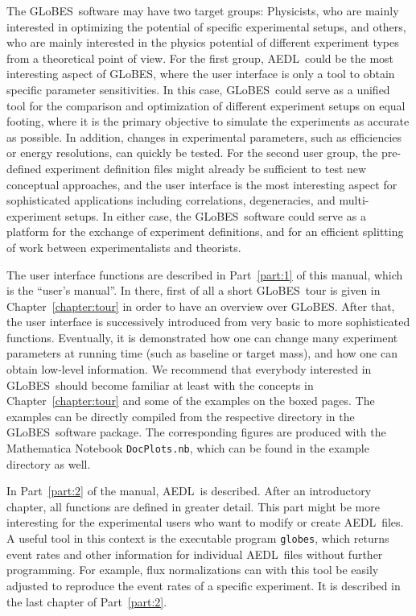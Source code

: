 \documentclass[a4paper,12pt,twoside]{book}
\newcommand{\Chapt}{Chapter}
\newcommand{\Part}{Part}
\newcommand{\GLOBES}{{\sf GLoBES}}
\newcommand{\AEDL}{{\sf AEDL}}
\begin{document}
The \GLOBES\ software may have two target groups: 
Physicists, who are mainly interested in optimizing the potential
of specific experimental setups, and others, who are mainly
interested in the physics potential of different experiment types
from a theoretical point of view.
For the first group, \AEDL\ could be the most interesting aspect of
\GLOBES , where the user interface is only a tool to obtain specific
parameter sensitivities. In this case, \GLOBES\ could serve as a
unified tool for the comparison and optimization of different experiment
 setups on equal footing, where
it is the primary objective to simulate the experiments as accurate
as possible. In addition, changes in experimental parameters, such as
efficiencies or energy resolutions, can quickly be tested.
%
For the second user group, the pre-defined 
experiment definition files might already be sufficient to test
new conceptual approaches, and the user interface is the most interesting
aspect for sophisticated applications including correlations,
degeneracies, and multi-experiment setups. In either case, the \GLOBES\
software could serve as a platform for the exchange of experiment
definitions, and for an efficient splitting of work between
experimentalists and theorists.

The user interface functions are described in \Part~\ref{part:1} of 
this manual, which is the ``user's manual''. In there, first of all a 
short \GLOBES\ tour is given in \Chapt~\ref{chapter:tour} in order to 
have an overview over \GLOBES .
After that, the user
interface is successively introduced from very basic to more sophisticated
functions. Eventually, it is demonstrated how one can change many
experiment parameters at running time (such as baseline or target mass), and how one can obtain low-level
information. We recommend that everybody interested in \GLOBES\ should
become familiar at least with the concepts in \Chapt~\ref{chapter:tour}
 and some of the examples on the boxed pages. The examples can be 
 directly compiled 
 from the respective directory in the \GLOBES\ software package.
The corresponding figures are produced with the
Mathematica Notebook {\tt DocPlots.nb}, which can be found
in the example directory as well.

In \Part~\ref{part:2} of the manual, \AEDL\ is described. After an
introductory chapter, all functions are defined in greater detail.
This part might be more interesting for the experimental users who
want to modify or create \AEDL\ files. A useful tool in this context
is the executable program \verb+globes+, which returns event rates and other
information for individual \AEDL\ files without further programming. 
For example, flux normalizations can with this tool be easily adjusted 
to reproduce the event rates of a specific experiment. It is described
in the last chapter of \Part~\ref{part:2}.
\end{document}

